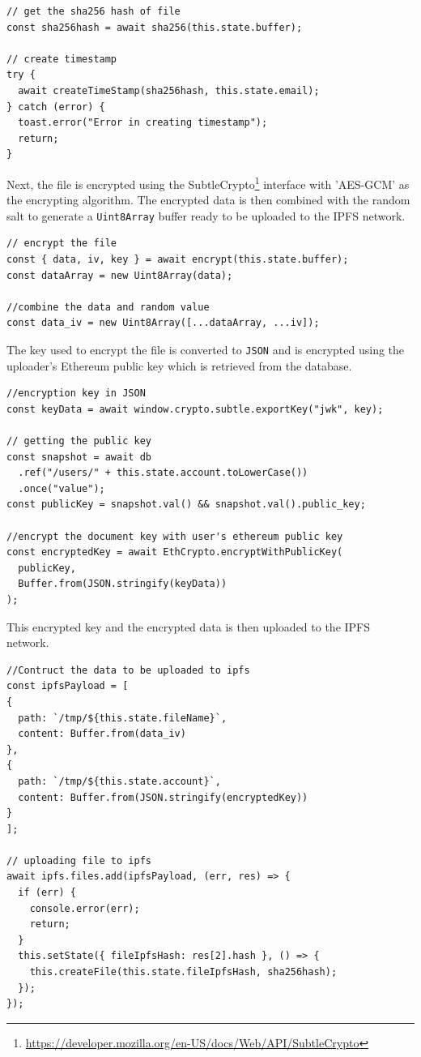 \documentclass[]{article}
\begin{document}
\begin{verbatim}
// get the sha256 hash of file
const sha256hash = await sha256(this.state.buffer);

// create timestamp
try {
  await createTimeStamp(sha256hash, this.state.email);
} catch (error) {
  toast.error("Error in creating timestamp");
  return;
}
\end{verbatim}

		Next, the file is encrypted using the SubtleCrypto\footnote{\url{https://developer.mozilla.org/en-US/docs/Web/API/SubtleCrypto}} interface with 'AES-GCM' as the encrypting algorithm. The encrypted data is then combined with the random salt to generate a \texttt{Uint8Array} buffer ready to be uploaded to the IPFS network.

\begin{verbatim}
// encrypt the file
const { data, iv, key } = await encrypt(this.state.buffer);
const dataArray = new Uint8Array(data);

//combine the data and random value
const data_iv = new Uint8Array([...dataArray, ...iv]);
\end{verbatim}

		The key used to encrypt the file is converted to \texttt{JSON} and is encrypted using the uploader's Ethereum public key which is retrieved from the database.
		
\begin{verbatim}
//encryption key in JSON
const keyData = await window.crypto.subtle.exportKey("jwk", key);

// getting the public key
const snapshot = await db
  .ref("/users/" + this.state.account.toLowerCase())
  .once("value");
const publicKey = snapshot.val() && snapshot.val().public_key;

//encrypt the document key with user's ethereum public key
const encryptedKey = await EthCrypto.encryptWithPublicKey(
  publicKey,
  Buffer.from(JSON.stringify(keyData))
);
\end{verbatim}

		This encrypted key and the encrypted data is then uploaded to the IPFS network.
		
\begin{verbatim}
//Contruct the data to be uploaded to ipfs
const ipfsPayload = [
{
  path: `/tmp/${this.state.fileName}`,
  content: Buffer.from(data_iv)
},
{
  path: `/tmp/${this.state.account}`,
  content: Buffer.from(JSON.stringify(encryptedKey))
}
];

// uploading file to ipfs
await ipfs.files.add(ipfsPayload, (err, res) => {
  if (err) {
    console.error(err);
    return;
  }
  this.setState({ fileIpfsHash: res[2].hash }, () => {
    this.createFile(this.state.fileIpfsHash, sha256hash);
  });
});
\end{verbatim}
\end{document}

